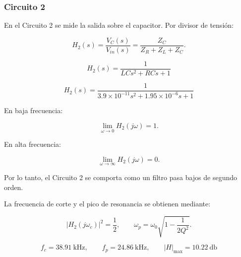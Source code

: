 \subsubsection{Circuito 2}

En el Circuito 2 se mide la salida sobre el capacitor. Por divisor de tensión:

\begin{equation}
    H_2(s)=\frac{V_C(s)}{V_{in}(s)}
    =
    \frac{Z_C}{Z_R+Z_L+Z_C}.
\end{equation}

\begin{equation}
    \boxed{
    H_2(s)=
    \frac{1}
    {LCs^2+RCs+1}
    }
\end{equation}

\begin{equation}
    \boxed{
    H_2(s)=
    \frac{1}
    {3.9\times10^{-11}s^2+1.95\times10^{-6}s+1}
    }
\end{equation}

En baja frecuencia:

\begin{equation}
    \lim_{\omega\to0}H_2(j\omega)=1.
\end{equation}

En alta frecuencia:

\begin{equation}
    \lim_{\omega\to\infty}H_2(j\omega)=0.
\end{equation}

Por lo tanto, el Circuito 2 se comporta como un filtro pasa bajos de segundo orden.

La frecuencia de corte y el pico de resonancia se obtienen mediante:

\begin{equation}
    |H_2(j\omega_c)|^2=\frac{1}{2},
    \qquad
    \omega_p=\omega_0\sqrt{1-\frac{1}{2Q^2}}.
\end{equation}

\begin{equation}
    \boxed{
    f_c=\SI{38.91}{\kilo\hertz},
    \qquad
    f_p=\SI{24.86}{\kilo\hertz},
    \qquad
    |H|_{\max}=\SI{10.22}{\decibel}
    }
\end{equation}

\begin{table}[H]
\centering
\caption{$H_2(s)$}
\label{tab:circuito2_parametros}
\end{table}

